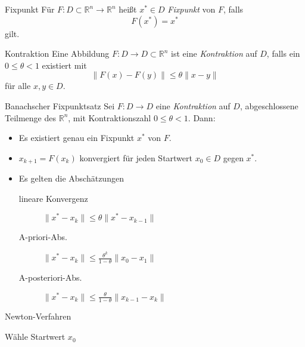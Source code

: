 
\begin{flashcard}[Definition]{Fixpunkt}
	Für $F : D \subset \mathbb{R}^n \rightarrow \mathbb{R}^n$ heißt $x^* \in D$ \emph{Fixpunkt} von $F$, falls
$$
	F(x^*) = x^*
$$
	gilt.
\end{flashcard}

\begin{flashcard}[Definition]{Kontraktion}
Eine Abbildung $F : D \rightarrow D \subset \mathbb{R}^n$ ist eine \emph{Kontraktion} auf $D$, falls ein $0 \leq \theta < 1$ existiert mit
$$
\| F(x) - F(y) \| \leq \theta \| x - y \|
$$
für alle $x, y \in D$.

\end{flashcard}

\begin{flashcard}[Satz]{Banachscher Fixpunktsatz}
Sei $F : D \rightarrow D$ eine \emph{Kontraktion} auf $D$, abgeschlossene Teilmenge des $\mathbb{R}^n$, mit Kontraktionszahl $0 \leq \theta < 1$.
Dann:

\begin{itemize}
	\item Es existiert genau ein Fixpunkt $x^*$ von $F$.
	\item $x_{k+1} = F(x_k)$ konvergiert für jeden Startwert $x_0 \in D$ gegen $x^*$.
	\item Es gelten die Abschätzungen
		\begin{description}
			\item[lineare Konvergenz] $\| x^* - x_k\| \leq \theta \|x^* - x_{k-1}\|$
			\item[A-priori-Abs.] $\| x^* - x_k\| \leq \frac{\theta^k}{1-\theta} \|x_0 - x_1\|$
			\item[A-posteriori-Abs.] $\| x^* - x_k\| \leq \frac{\theta}{1-\theta} \|x_{k-1} - x_k\|$
		\end{description}
\end{itemize}
\end{flashcard}

\begin{flashcard}[Algorithmus]{Newton-Verfahren}
\begin{algorithm}[H]
	Wähle Startwert $x_0$\\
\end{algorithm}
\end{flashcard}

